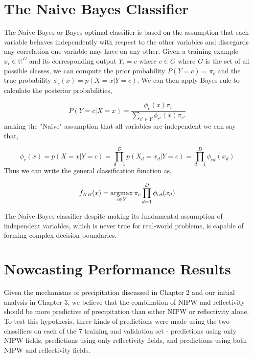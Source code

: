 \documentclass[proposal]{umassthesis}
\begin{document}
\section{The Naive Bayes Classifier }

The Naive Bayes or Bayes optimal classifier \cite{zhang2004optimality} is based on the assumption that each variable behaves independently with respect to the other variables and disregards any correlation one variable may have on any other. Given a training example $x_i \in \mathbb{R}^D$ and its corresponding output $Y_i = c$ where $c \in G$ where $G$ is the set of all possible classes, we can compute the prior probability $P(Y = c) = \pi_c$ and the true probability $\phi_c(x) = p(X = x | Y = c)$.  We can then apply Bayes rule to calculate the posterior probabilities,

\begin{equation}
P(Y = c | X = x) = \dfrac{\phi_c(x) \pi_c}{\sum_{c' \in Y}\phi_{c'}(x) \pi_{c'}}
\end{equation}
making the "Naive" assumption that all variables are independent we can say that,

\begin{equation}
\phi_c(x) = p(X = x | Y = c) = \prod_{d=1}^{D} p(X_d = x_d | Y = c) = \prod_{d=1}^{D}\phi_{cd}(x_d)
\end{equation}
Thus we can write the general classification function as,

\begin{equation}
f_{NB}(x) = \operatornamewithlimits{argmax}\limits_{c \in Y} \pi_c \prod_{d = 1}^{D} \phi_{cd}(x_d)
\end{equation}

The Naive Bayes classifier despite making its fundamental assumption of independent variables, which is never true for real-world problems, is capable of forming complex decision boundaries.

 
 \section{Nowcasting Performance Results}
 
Given the mechanisms of precipitation discussed in Chapter 2 and our initial analysis in Chapter 3, we believe that the combination of NIPW and reflectivity should be more predictive of precipitation than either NIPW or reflectivity alone. To test this hypothesis, three kinds of predictions were made using the two classifiers on each of the 7 training and validation set - predictions using only NIPW fields, predictions using only reflectivity fields, and predictions using both NIPW and reflectivity fields. 
\end{document}
